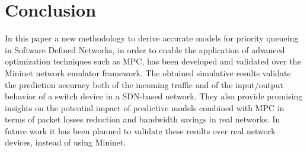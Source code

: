 \chapter{Conclusion} 
In this paper a new methodology to derive accurate models for priority queueing in Software Defined Networks, in order to enable the application of advanced optimization techniques such as MPC, has been developed and validated over the Mininet network emulator framework. The obtained simulative results validate the prediction accuracy both of the incoming traffic and of the input/output behavior of a switch device in a SDN-based network. They also provide promising insights on the potential impact of predictive models combined with MPC in terms of packet losses reduction and bandwidth savings in real networks. In future work it has been planned to validate these results over real network devices, instead of using Mininet.
